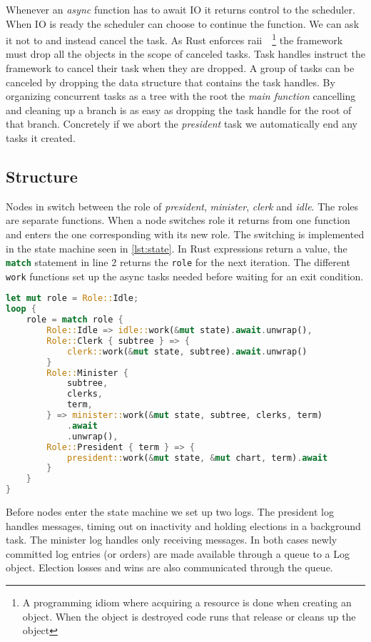 Whenever an \textit{async} function has to await IO it returns control to the scheduler. When IO is ready the scheduler can choose to continue the function. We can ask it not to and instead cancel the task. As Rust enforces \acf{raii}~\cite[p.~389]{raii}~\footnote{A programming idiom where acquiring a resource is done when creating an object. When the object is destroyed code runs that release or cleans up the object} the framework must drop all the objects in the scope of canceled tasks. 
Task handles instruct the framework to cancel their task when they are dropped. A group of tasks can be canceled by dropping the data structure that contains the task handles. By organizing concurrent tasks as a tree with the root the \textsl{main function} cancelling and cleaning up a branch is as easy as dropping the task handle for the root of that branch. Concretely if we abort the \textsl{president} task we automatically end any tasks it created.

\subsection{Structure}
Nodes in \name{} switch between the role of \textit{president}, \textit{minister}, \textit{clerk} and \textit{idle}. The roles are separate functions. When a node switches role it returns from one function and enters the one corresponding with its new role. The switching is implemented in the state machine seen in \cref{lst:state}. In Rust expressions return a value, the \lstinline[language=rust]{match} statement in line 2 returns the \lstinline[language=rust]{role} for the next iteration. The different \lstinline[language=rust]{work} functions set up the async tasks needed before waiting for an exit condition.
%
\begin{lstlisting}[float,language=rust,style=boxed,tabsize=2,caption={The state machine switching between a nodes different roles},label=lst:state]
let mut role = Role::Idle;
loop {
	role = match role {
		Role::Idle => idle::work(&mut state).await.unwrap(),
		Role::Clerk { subtree } => {
			clerk::work(&mut state, subtree).await.unwrap()
		}
		Role::Minister {
			subtree,
			clerks,
			term,
		} => minister::work(&mut state, subtree, clerks, term)
			.await
			.unwrap(),
		Role::President { term } => {
			president::work(&mut state, &mut chart, term).await
		}
	}
}
\end{lstlisting}
\clearpage
%
Before nodes enter the state machine we set up two \raft{} logs. The president log handles messages, timing out on inactivity and holding elections in a background task. The minister log handles only receiving messages. In both cases newly committed log entries (or orders) are made available through a queue to a \raft{} Log object. Election losses and wins are also communicated through the queue.

